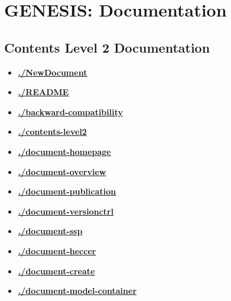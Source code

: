 \documentclass[12pt]{article}
\begin{document}
\section*{GENESIS: Documentation}

\subsection*{Contents Level 2 Documentation}

\begin{itemize}

\item \href{.././NewDocument/./NewDocument.pdf}{\bf \underline{./NewDocument}}

\item \href{.././README/./README.pdf}{\bf \underline{./README}}

\item \href{.././backward-compatibility/./backward-compatibility.pdf}{\bf \underline{./backward-compatibility}}

\item \href{.././contents-level2/./contents-level2.pdf}{\bf \underline{./contents-level2}}

\item \href{.././document-homepage/./document-homepage.pdf}{\bf \underline{./document-homepage}}

\item \href{.././document-overview/./document-overview.pdf}{\bf \underline{./document-overview}}

\item \href{.././document-publication/./document-publication.pdf}{\bf \underline{./document-publication}}

\item \href{.././document-versionctrl/./document-versionctrl.pdf}{\bf \underline{./document-versionctrl}}

\item \href{.././document-ssp/./document-ssp.pdf}{\bf \underline{./document-ssp}}

\item \href{.././document-heccer/./document-heccer.pdf}{\bf \underline{./document-heccer}}

\item \href{.././document-create/./document-create.pdf}{\bf \underline{./document-create}}

\item \href{.././document-model-container/./document-model-container.pdf}{\bf \underline{./document-model-container}}


\end{itemize}
\end{document}
